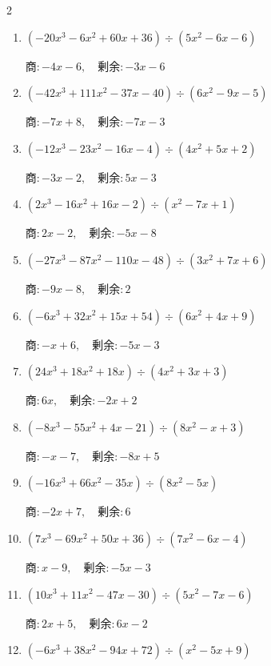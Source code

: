 \begin{multicols}{2}
\begin{enumerate}
  \item $(-20x^{3}-6x^{2}+60x+36) \div (5x^{2}-6x-6)$

        $商 : -4x-6, \quad 剰余 : -3x-6$

  \item $(-42x^{3}+111x^{2}-37x-40) \div (6x^{2}-9x-5)$

        $商 : -7x+8, \quad 剰余 : -7x-3$

  \item $(-12x^{3}-23x^{2}-16x-4) \div (4x^{2}+5x+2)$

        $商 : -3x-2, \quad 剰余 : 5x-3$

  \item $(2x^{3}-16x^{2}+16x-2) \div (x^{2}-7x+1)$

        $商 : 2x-2, \quad 剰余 : -5x-8$

  \item $(-27x^{3}-87x^{2}-110x-48) \div (3x^{2}+7x+6)$

        $商 : -9x-8, \quad 剰余 : 2$

\columnbreak %

  \item $(-6x^{3}+32x^{2}+15x+54) \div (6x^{2}+4x+9)$

        $商 : -x+6, \quad 剰余 : -5x-3$

  \item $(24x^{3}+18x^{2}+18x) \div (4x^{2}+3x+3)$

        $商 : 6x, \quad 剰余 : -2x+2$

  \item $(-8x^{3}-55x^{2}+4x-21) \div (8x^{2}-x+3)$

        $商 : -x-7, \quad 剰余 : -8x+5$

  \item $(-16x^{3}+66x^{2}-35x) \div (8x^{2}-5x)$

        $商 : -2x+7, \quad 剰余 : 6$

  \item $(7x^{3}-69x^{2}+50x+36) \div (7x^{2}-6x-4)$

        $商 : x-9, \quad 剰余 : -5x-3$

\columnbreak %

\resetques

  \item $(10x^{3}+11x^{2}-47x-30) \div (5x^{2}-7x-6)$

        $商 : 2x+5, \quad 剰余 : 6x-2$

  \item $(-6x^{3}+38x^{2}-94x+72) \div (x^{2}-5x+9)$


\end{enumerate}
\end{multicols}

